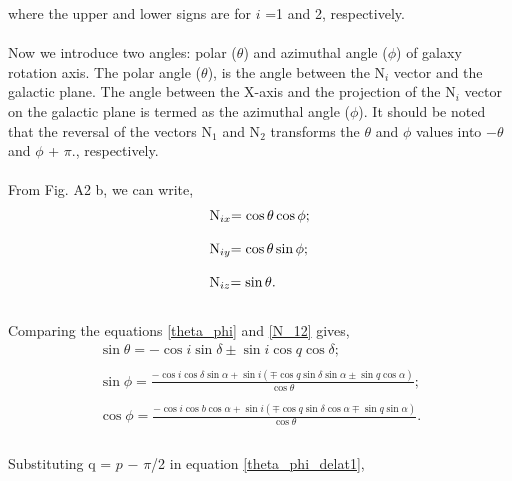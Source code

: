 where the upper and lower signs are for $i$ =1 and 2,
respectively.
\\
\\
Now we introduce two angles: polar ($\theta$) and azimuthal angle
($\phi$) of galaxy rotation axis. The polar angle ($\theta$), is
the angle between the N$_i$ vector and the galactic plane. The
angle between the X-axis and the projection of the N$_i$ vector on
the galactic plane is termed as the azimuthal angle ($\phi$). It
should be noted that the reversal of the vectors N$_1$ and N$_2$
transforms the $\theta$ and $\phi$ values into $-$$\theta$ and
$\phi$ + $\pi$., respectively.
\\
\\
From Fig. A2 b, we can write,
\begin{equation}\label{theta_phi}
\begin{array}{l}
$N$_{ix}$$ =  \cos \theta\cos \phi; \\
\\
$N$_{iy}$$ =  \cos \theta\sin \phi;  \\
\\
$N$_{iz}$$ =  \sin \theta. \\
\end{array}
\end{equation}\\
Comparing the equations \eqref{theta_phi} and \eqref{N_12} gives,
\begin{equation}\label{theta_phi_delat1}
\begin{array}{l}
\sin \theta = -\cos i\sin \delta \pm \sin i\cos q\cos \delta;\\
\\
\sin \phi = \frac{- \cos i\cos \delta\sin \alpha + \sin i(\mp \cos q \sin \delta\sin \alpha \pm \sin q\cos \alpha)}{\cos \theta};\\
\\
\cos \phi = \frac{- \cos i\cos b\cos \alpha + \sin i(\mp \cos q \sin \delta\cos \alpha \mp \sin q\sin \alpha)}{\cos \theta}.\\
\end{array}
\end{equation}\\
Substituting q = $p$ $-$ $\pi$/2 in equation \eqref{theta_phi_delat1},
$$
